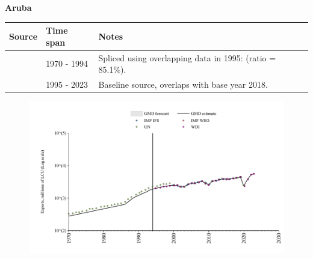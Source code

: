 \documentclass[12pt,a4paper,landscape]{article}
\begin{document}
\begin{adjustbox}{max totalsize={\paperwidth}{\paperheight},center}
\begin{minipage}[t][\textheight][t]{\textwidth}
\vspace*{0.5cm}
{}
\begin{center}
{\Large\bfseries Aruba}
\end{center}
\vspace{0.5cm}
\begin{table}[H]
\centering
\small
\begin{tabular}{|l|l|l|}
\hline
\textbf{Source} & \textbf{Time span} & \textbf{Notes} \\
\hline
\rowcolor{white}\cite{UN}& 1970 - 1994 &Spliced using overlapping data in 1995: (ratio = 85.1\%).\\
\rowcolor{lightgray}\cite{WDI}& 1995 - 2023 &Baseline source, overlaps with base year 2018.\\
\hline
\end{tabular}
\end{table}
\begin{figure}[H]
\centering
\includegraphics[width=\textwidth,height=0.6\textheight,keepaspectratio]{graphs/ABW_exports.pdf}
\end{figure}
\end{minipage}
\end{adjustbox}
\end{document}
